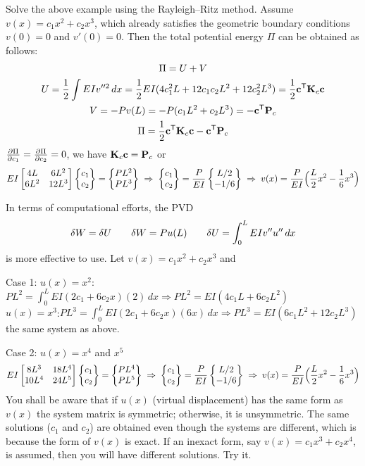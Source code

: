 \begin{example}
Solve the above example using the Rayleigh--Ritz method. Assume $v(x) = c_1x^2 + c_2x^3$, which already satisfies the geometric boundary conditions $v(0) = 0$ and $v'(0) = 0$. Then the total potential energy $\Pi$ can be obtained as follows:
\begin{gather*}
  \Pi = U + V\\
  U = \frac12\int EIv''^2\,dx = \frac12EI(4c_1^2L + 12c_1c_2L^2 + 12c_2^2L^3) = \frac12\mathbf{c}^{\mathsf{T}}\mathbf{K}_c\mathbf{c}\\
  V = -Pv(L) = -P(c_1L^2 + c_2L^3) = -\mathbf{c}^{\mathsf{T}}\mathbf{P}_c\\
  \Pi = \frac12\mathbf{c}^{\mathsf{T}}\mathbf{K}_c\mathbf{c} - \mathbf{c}^{\mathsf{T}}\mathbf{P}_c
\end{gather*}
$\frac{\partial \Pi}{\partial c_1} = \frac{\partial \Pi}{\partial c_2} = 0$, we have $\mathbf{K}_c\mathbf{c} = \mathbf{P}_c$ or
\begin{equation*}
  EI\begin{bmatrix}4L & 6L^2\\ 6L^2 & 12L^3\end{bmatrix}\begin{Bmatrix}c_1\\ c_2\end{Bmatrix} = \begin{Bmatrix}PL^2\\ PL^3\end{Bmatrix}
  \;\Rightarrow\; \begin{Bmatrix}c_1\\ c_2\end{Bmatrix} = \frac{P}{EI}\begin{Bmatrix}L/2\\ -1/6\end{Bmatrix}
  \;\Rightarrow\; v(x) = \frac{P}{EI}\Bigl(\frac L2x^2 - \frac16x^3\Bigr)
\end{equation*}
\begin{note}
In terms of computational efforts, the PVD
\begin{equation*}
  \delta W = \delta U\qquad \delta W = Pu(L)\qquad \delta U = \int_0^L EIv''u''\,dx
\end{equation*}
is more effective to use. Let $v(x) = c_1x^2 + c_2x^3$ and

Case 1: $u(x) = x^2$:\quad $PL^2 = \int_0^L EI(2c_1+6c_2x)(2)\,dx \Rightarrow PL^2 = EI(4c_1L + 6c_2L^2)$\\
\phantom{Case 1: }$u(x) = x^3$:\quad $PL^3 = \int_0^L EI(2c_1+6c_2x)(6x)\,dx \Rightarrow PL^3 = EI(6c_1L^2 + 12c_2L^3)$\\
the same system as above.

Case 2: $u(x) = x^4$ and $x^5$
\begin{equation*}
  EI\begin{bmatrix}8L^3 & 18L^4\\ 10L^4 & 24L^5\end{bmatrix}\begin{Bmatrix}c_1\\ c_2\end{Bmatrix} = \begin{Bmatrix}PL^4\\ PL^5\end{Bmatrix}
  \;\Rightarrow\; \begin{Bmatrix}c_1\\ c_2\end{Bmatrix} = \frac{P}{EI}\begin{Bmatrix}L/2\\ -1/6\end{Bmatrix}
  \;\Rightarrow\; v(x) = \frac{P}{EI}\Bigl(\frac L2x^2 - \frac16x^3\Bigr)
\end{equation*}
You shall be aware that if $u(x)$ (virtual displacement) has the same form as $v(x)$ the system matrix is symmetric; otherwise, it is unsymmetric. The same solutions ($c_1$ and $c_2$) are obtained even though the systems are different, which is because the form of $v(x)$ is exact. If an inexact form, say $v(x) = c_1x^3 + c_2x^4$, is assumed, then you will have different solutions. Try it.
\end{note}
\end{example}
